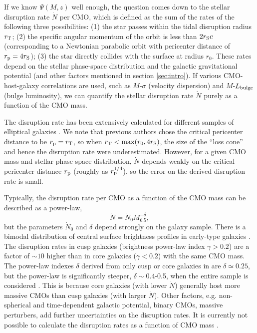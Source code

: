 \documentclass[useAMS,usenatbib]{mn2e}
\begin{document}
If we know $\Psi(M, z)$ well enough, the question comes down to the
stellar disruption rate $\dot{N}$ per CMO, which is defined as the sum
of the 
rates of the following three possibilities: (1) the star passes within
the tidal disruption radius $r_{\rm T}$; (2) the specific angular
momentum of the orbit is less than $2r_{\rm S}c$ (corresponding to
a Newtonian parabolic orbit with pericenter distance of $r_{\rm p} =
4r_{\rm S}$); 
(3) the star directly collides with the surface at radius $r_0$.
These rates depend on the stellar phase-space distribution and the
galactic gravitational potential (and other factors mentioned in section
\ref{sec:intro}). If various CMO-host-galaxy correlations
\citep[e.g.][]{2013ARA&A..51..511K} are used, such as 
$M$-$\sigma$ (velocity dispersion) and $M$-$L_{\rm bulge}$ (bulge
luminosity), we can quantify the stellar disruption rate $\dot{N}$
purely as a function of the CMO mass.

The disruption rate has
been extensively calculated for different samples of elliptical
galaxies \citep[e.g.][]{1999MNRAS.309..447M,
  2004ApJ...600..149W, 2016MNRAS.455..859S}. We note that previous
authors chose the critical pericenter distance to 
be $r_{\rm p}= r_{\rm T}$, so when $r_{\rm  T}<\mathrm{max}(r_0, 4r_{\rm
  S})$, the size of the ``loss cone'' and hence the disruption rate were 
underestimated. However, for a given CMO mass and 
stellar phase-space distribution, $\dot{N}$ depends weakly
on the critical pericenter distance $r_{\rm p}$ (roughly as $r_{\rm
  p}^{1/4}$), so the error on the derived disruption rate is small.

Typically, the disruption rate per CMO as a function of the
CMO mass can be described as a power-law,
\begin{equation}
  \label{eq:22}
  \dot{N} = \dot{N}_0 M_{6.5}^{-\delta},
\end{equation}
but the parameters $\dot{N}_0$ and $\delta$ depend strongly on
the galaxy sample. There is a bimodal distribution of
central surface brightness profiles in early-type galaxies
\citep[e.g.][]{2007ApJ...664..226L}. The disruption rates in cusp galaxies
(brightness power-law index $\gamma > 0.2$) are a factor of $\sim 
10$ higher than in core galaxies ($\gamma < 0.2$) with the same CMO
mass. The power-law indexes $\delta$ derived from only cusp or core
galaxies in \citet{2007ApJ...664..226L} are $\delta\simeq 0.25$, but the
power-law is significantly steeper, $\delta\sim 0.4$-0.5, when
the entire sample is considered \citep{2016MNRAS.455..859S}. This is
because core galaxies (with lower $\dot{N}$) generally host more
massive CMOs than cusp galaxies (with larger $\dot{N}$). Other factors,
e.g. non-spherical and time-dependent galactic potential, binary CMOs,
massive perturbers, add further uncertainties on the disruption
rates. It is currently not possible to calculate the
disruption rates as a function of CMO mass \citep[for 
recent discussions, see][]{2013ApJ...774...87V, 2013CQGra..30x4005M,
  2016MNRAS.461..371K}.
\end{document}
